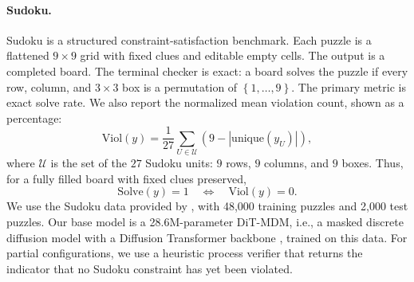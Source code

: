 \documentclass{article}
\numberwithin{theorem}{section}
\numberwithin{proposition}{section}
\numberwithin{corollary}{section}
\numberwithin{lemma}{section}
\numberwithin{conjecture}{section}
\numberwithin{remark}{section}
\numberwithin{definition}{section}
\numberwithin{assumption}{section}
\numberwithin{example}{section}
\newcommand{\mbra}[1]{\left\{#1\right\}}
\begin{document}
\begin{center}
\end{center}

\paragraph{Sudoku.}
Sudoku is a structured constraint-satisfaction benchmark. Each puzzle is a flattened $9\times 9$ grid with fixed clues and editable empty cells. The output is a completed board. The terminal checker is exact: a board solves the puzzle if every row, column, and $3\times3$ box is a permutation of $\mbra{1,\ldots,9}$. The primary metric is exact solve rate. We also report the normalized mean violation count, shown as a percentage:
\begin{equation*}
    \mathrm{Viol}(y)
=
    \frac{1}{27}
    \sum_{U\in\mathcal U}
    \left(9-\left|\mathrm{unique}(y_U)\right|\right),
\end{equation*}
where $\mathcal U$ is the set of the $27$ Sudoku units: $9$ rows, $9$ columns, and $9$ boxes. Thus, for a fully filled board with fixed clues preserved,
\begin{equation*}
    \mathrm{Solve}(y)=1
    \quad\Longleftrightarrow\quad
    \mathrm{Viol}(y)=0.
\end{equation*}
We use the Sudoku data provided by \citet{kim2025fine}, with 48,000 training puzzles and 2,000 test puzzles. Our base model is a 28.6M-parameter DiT-MDM, i.e., a masked discrete diffusion model \citep{sahoo2024simple} with a Diffusion Transformer backbone \citep{peebles2023scalable}, trained on this data. For partial configurations, we use a heuristic process verifier that returns the indicator that no Sudoku constraint has yet been violated.
\end{document}
